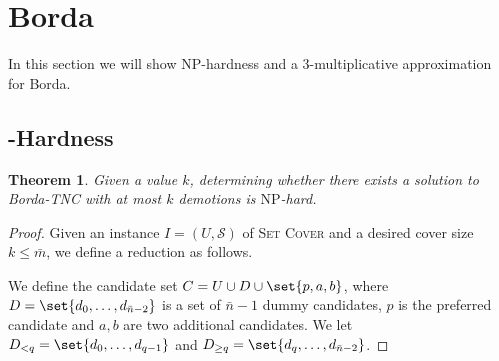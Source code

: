 \documentclass[letterpaper]{article} %
\newtheorem{theorem}{Theorem}
\newcommand{\SC}{\textsc{Set Cover}}
\newcommand{\SB}{\textsc{TNC}}
\newcommand{\NP}{\mathrm{NP}}
\begin{document}
\section{Borda}
In this section we will show $\NP$-hardness and a $3$-multiplicative approximation for Borda.
\subsection{\boldmath{$\NP$}-Hardness}\label{sec:borda_hardness}
\begin{theorem}\label{thr:borda_hardness}
Given a value $k$, determining whether there exists a solution to Borda-\SB{} with at most $k$ demotions  is $\NP$-hard.
\end{theorem}
\begin{proof}
Given an instance $I=(U,\mathcal{S})$ of \SC{} and a desired cover size $k \leq \bar{m}$, we define a reduction as follows. 

We define the candidate set $C=U \cup  D \cup \set{p,a,b}$, where $D=\set{d_0,\ldots,d_{\bar{n}-2}}$ is a set of $\bar{n}-1$ dummy candidates, $p$ is the preferred candidate and $a,b$ are  two additional candidates. We let $D_{<q}=\set{d_0,\ldots,d_{q-1}}$ and $D_{\geq q}=\set{d_{q},\ldots,d_{\bar{n}-2}}$. 


\end{proof}
\end{document}
